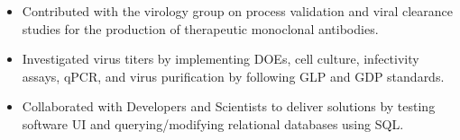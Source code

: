 \documentclass[10pt,a4paper]{altacv}
\begin{document}
\medskip







\begin{itemize}
    \item   \small{Contributed with the virology group on process validation and viral clearance studies for the production of therapeutic monoclonal antibodies.}
    \item   \small{Investigated virus titers by implementing DOEs, cell culture, infectivity assays, qPCR, and virus purification by following GLP and GDP standards.}
\end{itemize}

\medskip



\begin{itemize}
    \item   \small{Collaborated with Developers and Scientists to deliver solutions by testing software UI and querying/modifying relational databases using SQL.}
\end{itemize}

\medskip

\end{document}
